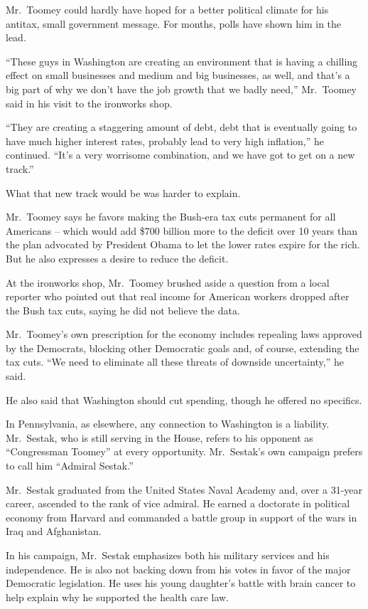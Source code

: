 ﻿\documentclass[12pt]{article}
\begin{document}
Mr.~Toomey could hardly have hoped for a better political climate for his antitax, small government
message. For months, polls have shown him in the lead.

``These guys in Washington are creating an environment that is having a chilling effect on small
businesses and medium and big businesses, as well, and that's a big part of why we don't have the
job growth that we badly need,'' Mr.~Toomey said in his visit to the ironworks shop.

``They are creating a staggering amount of debt, debt that is eventually going to have much higher
interest rates, probably lead to very high inflation,'' he continued. ``It's a very worrisome
combination, and we have got to get on a new track.''

What that new track would be was harder to explain.

Mr.~Toomey says he favors making the Bush-era tax cuts permanent for all Americans -- which would
add \$700 billion more to the deficit over 10 years than the plan advocated by President Obama to
let the lower rates expire for the rich. But he also expresses a desire to reduce the deficit.

At the ironworks shop, Mr.~Toomey brushed aside a question from a local reporter who pointed out
that real income for American workers dropped after the Bush tax cuts, saying he did not believe the
data.

Mr.~Toomey's own prescription for the economy includes repealing laws approved by the Democrats,
blocking other Democratic goals and, of course, extending the tax cuts. ``We need to eliminate all
these threats of downside uncertainty,'' he said.

He also said that Washington should cut spending, though he offered no specifics.

In Pennsylvania, as elsewhere, any connection to Washington is a liability. Mr.~Sestak, who is still
serving in the House, refers to his opponent as ``Congressman Toomey'' at every opportunity.
Mr.~Sestak's own campaign prefers to call him ``Admiral Sestak.''

Mr.~Sestak graduated from the United States Naval Academy and, over a 31-year career, ascended to
the rank of vice admiral. He earned a doctorate in political economy from Harvard and commanded a
battle group in support of the wars in Iraq and Afghanistan.

In his campaign, Mr.~Sestak emphasizes both his military services and his independence. He is also
not backing down from his votes in favor of the major Democratic legislation. He uses his young
daughter's battle with brain cancer to help explain why he supported the health care law.
\end{document}
